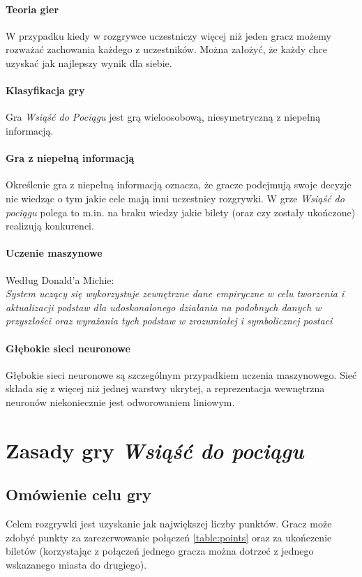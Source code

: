 \documentclass[12pt, oneside]{report}
\begin{document}
\paragraph{Teoria gier} W przypadku kiedy w rozgrywce uczestniczy więcej niż jeden gracz możemy rozważać zachowania każdego z uczestników. Można założyć, że każdy chce uzyskać jak najlepszy wynik dla siebie.
\paragraph{Klasyfikacja gry}
Gra \textit{Wsiąść do Pociągu} jest grą wieloosobową, niesymetryczną z niepełną informacją. 
\paragraph{Gra z niepełną informacją} 
Określenie gra z niepełną informacją oznacza, że gracze podejmują swoje decyzje nie wiedząc o tym jakie cele mają inni uczestnicy rozgrywki. W grze \textit{Wsiąść do pociągu} polega to m.in. na braku wiedzy jakie bilety (oraz czy zostały ukończone) realizują konkurenci.
\paragraph{Uczenie maszynowe}
Według Donald'a Michie: \\ \textit{System uczący się wykorzystuje zewnętrzne dane empiryczne w celu tworzenia i aktualizacji podstaw dla udoskonalonego działania na podobnych danych w przyszłości oraz wyrażania tych podstaw w zrozumiałej i symbolicznej postaci}
\paragraph{Głębokie sieci neuronowe}
Głębokie sieci neuronowe są szczególnym przypadkiem uczenia maszynowego. Sieć składa się z więcej niż jednej warstwy ukrytej, a reprezentacja wewnętrzna neuronów niekoniecznie jest odworowaniem liniowym.
\section{Zasady gry \textit{Wsiąść do pociągu}}
\subsection{Omówienie celu gry}
Celem rozgrywki jest uzyskanie jak największej liczby punktów. Gracz może zdobyć punkty za zarezerwowanie połączeń \ref{table:points} oraz za ukończenie biletów (korzystając z połączeń jednego gracza można dotrzeć z jednego wskazanego miasta do drugiego). 
\end{document}
